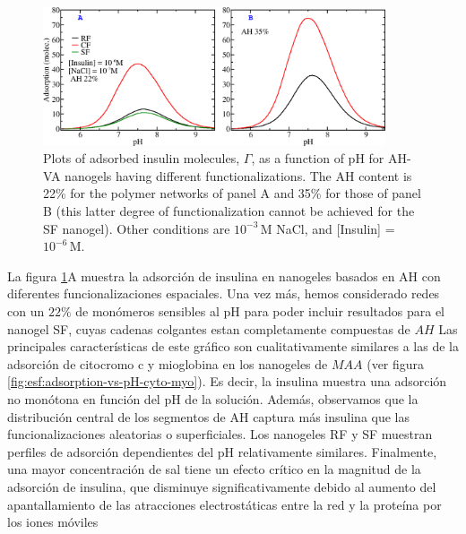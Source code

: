 \begin{figure}[!htb]
    \centering
    \includegraphics[width=0.9\textwidth]{Figures/graphs-gel2/insu-PAH.png}
    \caption{Plots of adsorbed insulin molecules, $\Gamma$, as a function of pH for  AH-VA nanogels having different functionalizations.
    The AH content is 22\% for the polymer networks of panel A and 35\% for those of panel B (this latter degree of functionalization cannot be achieved for the SF nanogel).
    Other conditions are $10^{-3}$\,M NaCl, and [Insulin] = $10^{-6}$\,M.}
    \label{fig:esf:adsorption-vs-pH-insulin}
\end{figure}




La figura \ref{fig:esf:adsorption-vs-pH-insulin}A muestra la adsorci\'on de insulina en nanogeles basados en AH con diferentes funcionalizaciones espaciales.
Una vez m\'as, hemos considerado redes con un $22\%$ de mon\'omeros sensibles al pH para poder incluir resultados para el nanogel SF, cuyas cadenas colgantes estan completamente compuestas  de $AH$
Las principales caracter\'isticas de este gr\'afico son cualitativamente similares a las de la adsorci\'on de citocromo c y mioglobina en los nanogeles de $MAA$ (ver figura \ref{fig:esf:adsorption-vs-pH-cyto-myo}).
Es decir, la insulina muestra una adsorci\'on no mon\'otona en función del pH de la soluci\'on.
Adem\'as, observamos que la distribuci\'on central de los segmentos de AH captura m\'as insulina que las funcionalizaciones aleatorias o superficiales.
Los nanogeles RF y SF muestran perfiles de adsorci\'on dependientes del pH relativamente similares.
Finalmente, una mayor concentraci\'on de sal tiene un efecto cr\'itico en la magnitud de la adsorci\'on de insulina, que disminuye significativamente debido al aumento del apantallamiento de las atracciones electrost\'aticas entre la red y la prote\'ina por los iones m\'oviles

